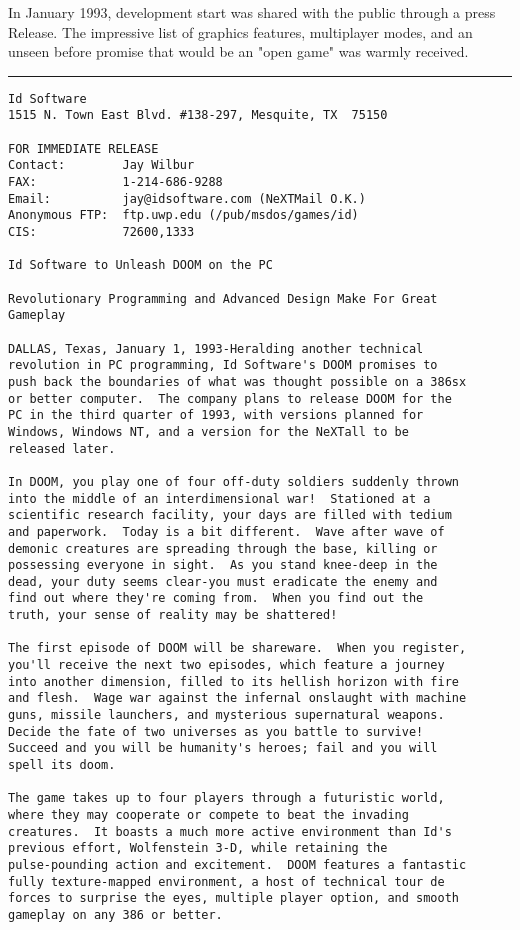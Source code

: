 In January 1993, \doom{} development start was shared with the public through a press Release. The impressive list of graphics features, multiplayer modes, and an unseen before promise that \doom{} would be an "open game" was warmly received.\\
\par
\vspace{10pt}
\label{label_pressrelease}
\hrule \par
\begin{verbatim}
Id Software
1515 N. Town East Blvd. #138-297, Mesquite, TX  75150

FOR IMMEDIATE RELEASE
Contact:        Jay Wilbur
FAX:            1-214-686-9288
Email:          jay@idsoftware.com (NeXTMail O.K.)
Anonymous FTP:  ftp.uwp.edu (/pub/msdos/games/id)
CIS:            72600,1333

Id Software to Unleash DOOM on the PC

Revolutionary Programming and Advanced Design Make For Great
Gameplay

DALLAS, Texas, January 1, 1993-Heralding another technical
revolution in PC programming, Id Software's DOOM promises to
push back the boundaries of what was thought possible on a 386sx
or better computer.  The company plans to release DOOM for the
PC in the third quarter of 1993, with versions planned for 
Windows, Windows NT, and a version for the NeXTall to be
released later.

In DOOM, you play one of four off-duty soldiers suddenly thrown
into the middle of an interdimensional war!  Stationed at a
scientific research facility, your days are filled with tedium
and paperwork.  Today is a bit different.  Wave after wave of
demonic creatures are spreading through the base, killing or
possessing everyone in sight.  As you stand knee-deep in the
dead, your duty seems clear-you must eradicate the enemy and
find out where they're coming from.  When you find out the
truth, your sense of reality may be shattered!

The first episode of DOOM will be shareware.  When you register,
you'll receive the next two episodes, which feature a journey
into another dimension, filled to its hellish horizon with fire
and flesh.  Wage war against the infernal onslaught with machine
guns, missile launchers, and mysterious supernatural weapons. 
Decide the fate of two universes as you battle to survive! 
Succeed and you will be humanity's heroes; fail and you will
spell its doom.

The game takes up to four players through a futuristic world,
where they may cooperate or compete to beat the invading
creatures.  It boasts a much more active environment than Id's
previous effort, Wolfenstein 3-D, while retaining the
pulse-pounding action and excitement.  DOOM features a fantastic
fully texture-mapped environment, a host of technical tour de
forces to surprise the eyes, multiple player option, and smooth
gameplay on any 386 or better.


\end{verbatim}
